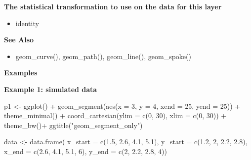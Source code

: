 \documentclass[
  letterpaper,
  DIV=11,
  numbers=noendperiod]{scrreprt}
\newenvironment{Shaded}{\begin{snugshade}}{\end{snugshade}}
\newcommand{\AttributeTok}[1]{\textcolor[rgb]{0.40,0.45,0.13}{#1}}
\newcommand{\DecValTok}[1]{\textcolor[rgb]{0.68,0.00,0.00}{#1}}
\newcommand{\FloatTok}[1]{\textcolor[rgb]{0.68,0.00,0.00}{#1}}
\newcommand{\FunctionTok}[1]{\textcolor[rgb]{0.28,0.35,0.67}{#1}}
\newcommand{\NormalTok}[1]{\textcolor[rgb]{0.00,0.23,0.31}{#1}}
\newcommand{\OtherTok}[1]{\textcolor[rgb]{0.00,0.23,0.31}{#1}}
\newcommand{\SpecialCharTok}[1]{\textcolor[rgb]{0.37,0.37,0.37}{#1}}
\newcommand{\StringTok}[1]{\textcolor[rgb]{0.13,0.47,0.30}{#1}}
\providecommand{\tightlist}{%
  \setlength{\itemsep}{0pt}\setlength{\parskip}{0pt}}\usepackage{longtable,booktabs,array}
\begin{document}
\textbf{The statistical transformation to use on the data for this
layer}

\begin{itemize}
\tightlist
\item
  identity
\end{itemize}

\textbf{See Also}

\begin{itemize}
\tightlist
\item
  geom\_curve(), geom\_path(), geom\_line(), geom\_spoke()
\end{itemize}

\textbf{Examples}

\textbf{Example 1: simulated data}

\begin{Shaded}
\begin{Highlighting}[]
\NormalTok{p1 }\OtherTok{\textless{}{-}} \FunctionTok{ggplot}\NormalTok{() }\SpecialCharTok{+} 
  \FunctionTok{geom\_segment}\NormalTok{(}\FunctionTok{aes}\NormalTok{(}\AttributeTok{x =} \DecValTok{3}\NormalTok{, }\AttributeTok{y =} \DecValTok{4}\NormalTok{, }\AttributeTok{xend =} \DecValTok{25}\NormalTok{, }\AttributeTok{yend =} \DecValTok{25}\NormalTok{)) }\SpecialCharTok{+}
  \FunctionTok{theme\_minimal}\NormalTok{() }\SpecialCharTok{+}
  \FunctionTok{coord\_cartesian}\NormalTok{(}\AttributeTok{ylim =} \FunctionTok{c}\NormalTok{(}\DecValTok{0}\NormalTok{, }\DecValTok{30}\NormalTok{), }\AttributeTok{xlim =} \FunctionTok{c}\NormalTok{(}\DecValTok{0}\NormalTok{, }\DecValTok{30}\NormalTok{)) }\SpecialCharTok{+}
  \FunctionTok{theme\_bw}\NormalTok{()}\SpecialCharTok{+}
  \FunctionTok{ggtitle}\NormalTok{(}\StringTok{"geom\_segment\_only"}\NormalTok{)}


\NormalTok{data }\OtherTok{\textless{}{-}} \FunctionTok{data.frame}\NormalTok{(}
  \AttributeTok{x\_start =} \FunctionTok{c}\NormalTok{(}\FloatTok{1.5}\NormalTok{, }\FloatTok{2.6}\NormalTok{, }\FloatTok{4.1}\NormalTok{, }\FloatTok{5.1}\NormalTok{),}
  \AttributeTok{y\_start =} \FunctionTok{c}\NormalTok{(}\FloatTok{1.2}\NormalTok{, }\DecValTok{2}\NormalTok{, }\FloatTok{2.2}\NormalTok{, }\FloatTok{2.8}\NormalTok{),}
  \AttributeTok{x\_end =} \FunctionTok{c}\NormalTok{(}\FloatTok{2.6}\NormalTok{, }\FloatTok{4.1}\NormalTok{, }\FloatTok{5.1}\NormalTok{, }\DecValTok{6}\NormalTok{),}
  \AttributeTok{y\_end =} \FunctionTok{c}\NormalTok{(}\DecValTok{2}\NormalTok{, }\FloatTok{2.2}\NormalTok{, }\FloatTok{2.8}\NormalTok{, }\DecValTok{4}\NormalTok{))}


\end{Highlighting}
\end{Shaded}
\end{document}
